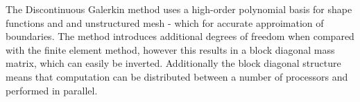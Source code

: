 The Discontinuous Galerkin method uses a high-order polynomial basis for shape functions and and unstructured mesh - which for accurate approimation of boundaries. The method introduces additional degrees of freedom when compared with the finite element method, however this results in a block diagonal mass matrix, which can easily be inverted. Additionally the block diagonal structure means that computation can be distributed between a number of processors and performed in parallel.



  


  





